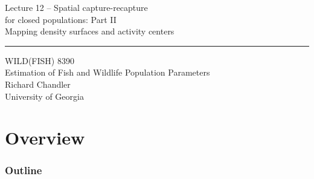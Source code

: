 \documentclass[color=usenames,dvipsnames]{beamer}\usepackage[]{graphicx}\usepackage[]{color}
\begin{document}
\begin{frame}[plain]
  \LARGE
  \centering
  {
    \LARGE Lecture 12 -- Spatial capture-recapture \\
    for closed populations: Part II \\
    \Large Mapping density surfaces and activity centers \\
  }
  {\color{default} \rule{\textwidth}{0.1pt} }
  \vfill
  \large
  WILD(FISH) 8390 \\
  Estimation of Fish and Wildlife Population Parameters \\
  \vfill
  \large
  Richard Chandler \\
  University of Georgia \\
\end{frame}






\section{Overview}



\begin{frame}[plain]
  \frametitle{Outline}
  \Large
\end{frame}




\end{document}
